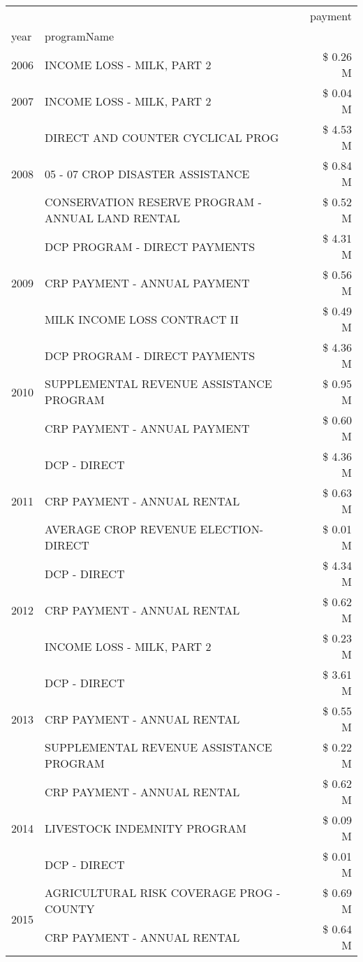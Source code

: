 \begin{tabular}{llr}
\toprule
 &  & payment \\
year & programName &  \\
\midrule
2006 & INCOME LOSS - MILK, PART 2 & \$ 0.26 M \\
\cline{1-3}
2007 & INCOME LOSS - MILK, PART 2 & \$ 0.04 M \\
\cline{1-3}
\multirow[t]{3}{*}{2008} & DIRECT AND COUNTER CYCLICAL PROG & \$ 4.53 M \\
 & 05 - 07 CROP DISASTER ASSISTANCE & \$ 0.84 M \\
 & CONSERVATION RESERVE PROGRAM - ANNUAL LAND RENTAL & \$ 0.52 M \\
\cline{1-3}
\multirow[t]{3}{*}{2009} & DCP PROGRAM - DIRECT PAYMENTS & \$ 4.31 M \\
 & CRP PAYMENT - ANNUAL PAYMENT & \$ 0.56 M \\
 & MILK INCOME LOSS CONTRACT II & \$ 0.49 M \\
\cline{1-3}
\multirow[t]{3}{*}{2010} & DCP PROGRAM - DIRECT PAYMENTS & \$ 4.36 M \\
 & SUPPLEMENTAL REVENUE ASSISTANCE PROGRAM & \$ 0.95 M \\
 & CRP PAYMENT - ANNUAL PAYMENT & \$ 0.60 M \\
\cline{1-3}
\multirow[t]{3}{*}{2011} & DCP - DIRECT & \$ 4.36 M \\
 & CRP PAYMENT - ANNUAL RENTAL & \$ 0.63 M \\
 & AVERAGE CROP REVENUE ELECTION-DIRECT & \$ 0.01 M \\
\cline{1-3}
\multirow[t]{3}{*}{2012} & DCP - DIRECT & \$ 4.34 M \\
 & CRP PAYMENT - ANNUAL RENTAL & \$ 0.62 M \\
 & INCOME LOSS - MILK, PART 2 & \$ 0.23 M \\
\cline{1-3}
\multirow[t]{3}{*}{2013} & DCP - DIRECT & \$ 3.61 M \\
 & CRP PAYMENT - ANNUAL RENTAL & \$ 0.55 M \\
 & SUPPLEMENTAL REVENUE ASSISTANCE PROGRAM & \$ 0.22 M \\
\cline{1-3}
\multirow[t]{3}{*}{2014} & CRP PAYMENT - ANNUAL RENTAL & \$ 0.62 M \\
 & LIVESTOCK INDEMNITY PROGRAM & \$ 0.09 M \\
 & DCP - DIRECT & \$ 0.01 M \\
\cline{1-3}
\multirow[t]{3}{*}{2015} & AGRICULTURAL RISK COVERAGE PROG - COUNTY & \$ 0.69 M \\
 & CRP PAYMENT - ANNUAL RENTAL & \$ 0.64 M \\

\end{tabular}
